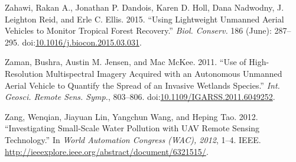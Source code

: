 \documentclass[]{interact}
\theoremstyle{plain}%
\theoremstyle{definition}
\theoremstyle{remark}
\begin{document}
\hypertarget{ref-zahawi_using_2015}{}
Zahawi, Rakan A., Jonathan P. Dandois, Karen D. Holl, Dana Nadwodny, J.
Leighton Reid, and Erle C. Ellis. 2015. ``Using Lightweight Unmanned
Aerial Vehicles to Monitor Tropical Forest Recovery.'' \emph{Biol.
Conserv.} 186 (June): 287--295.
doi:\href{https://doi.org/10.1016/j.biocon.2015.03.031}{10.1016/j.biocon.2015.03.031}.

\hypertarget{ref-zaman_use_2011}{}
Zaman, Bushra, Austin M. Jensen, and Mac McKee. 2011. ``Use of
High-Resolution Multispectral Imagery Acquired with an Autonomous
Unmanned Aerial Vehicle to Quantify the Spread of an Invasive Wetlands
Species.'' \emph{Int. Geosci. Remote Sens. Symp.}, 803--806.
doi:\href{https://doi.org/10.1109/IGARSS.2011.6049252}{10.1109/IGARSS.2011.6049252}.

\hypertarget{ref-zang_investigating_2012}{}
Zang, Wenqian, Jiayuan Lin, Yangchun Wang, and Heping Tao. 2012.
``Investigating Small-Scale Water Pollution with UAV Remote Sensing
Technology.'' In \emph{World Automation Congress (WAC), 2012}, 1--4.
IEEE. \url{http://ieeexplore.ieee.org/abstract/document/6321515/}.

\newpage
\singlespacing 
\end{document}
